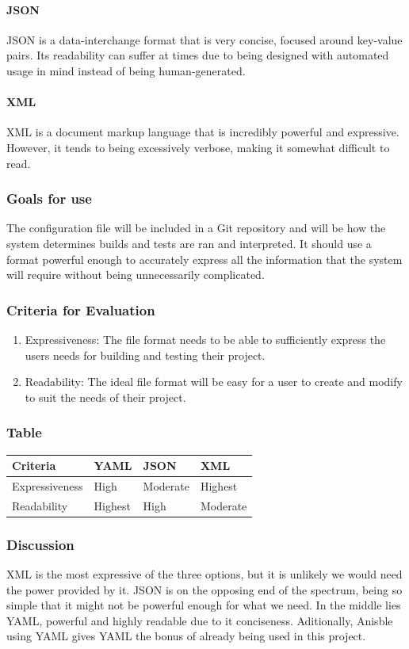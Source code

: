\documentclass[10pt,letterpaper,onecolumn,draftclsnofoot]{IEEEtran}
\begin{document}
\paragraph{JSON}
JSON is a data-interchange format that is very concise, focused around key-value pairs. Its readability can suffer at times due to being designed with automated usage in mind instead of being human-generated.
\paragraph{XML}
XML is a document markup language that is incredibly powerful and expressive. However, it tends to being excessively verbose, making it somewhat difficult to read.
\subsubsection{Goals for use}
The configuration file will be included in a Git repository and will be how the system determines builds and tests are ran and interpreted. It should use a format powerful enough to accurately express all the information that the system will require without being unnecessarily complicated.
\subsubsection{Criteria for Evaluation}
\begin{enumerate}
  \item Expressiveness: The file format needs to be able to sufficiently express the users needs for building and testing their project.
  \item Readability: The ideal file format will be easy for a user to create and modify to suit the needs of their project.
\end{enumerate}
\subsubsection{Table}
\begin{center}
  \begin{tabular}{llll}
    Criteria & YAML & JSON & XML \\ \midrule
    Expressiveness       & High & Moderate & Highest \\ \midrule
    Readability       & Highest & High & Moderate \\ \bottomrule
  \end{tabular}
\end{center}
\subsubsection{Discussion}
XML is the most expressive of the three options, but it is unlikely we would need the power provided by it. JSON is on the opposing end of the spectrum, being so simple that it might not be powerful enough for what we need. In the middle lies YAML, powerful and highly readable due to it conciseness. Aditionally, Anisble using YAML gives YAML the bonus of already being used in this project.
\end{document}
